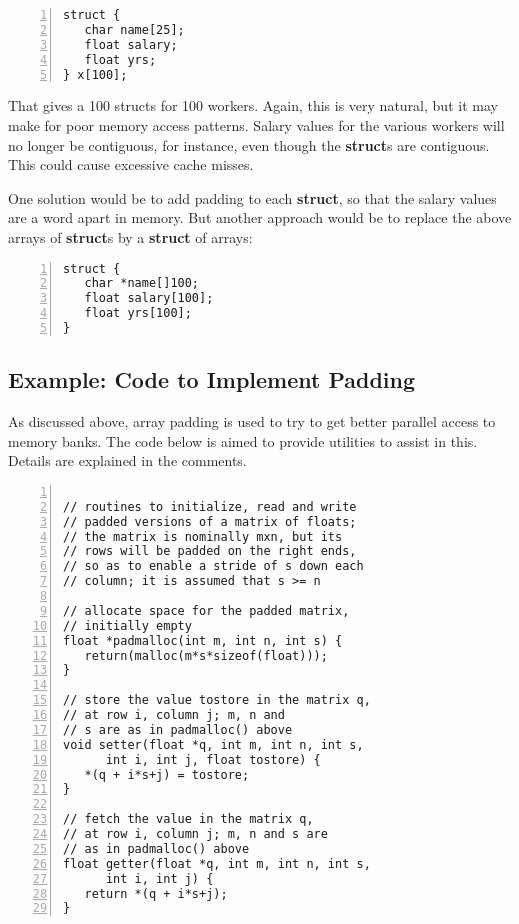 \begin{lstlisting}[numbers=left]
struct {
   char name[25];
   float salary;
   float yrs;
} x[100];
\end{lstlisting}

That gives a 100 structs for 100 workers.  Again, this is very natural,
but it may make for poor memory access patterns.  Salary values for the
various workers will no longer be contiguous, for instance, even though
the {\bf struct}s are contiguous.  This could cause excessive cache
misses.

One solution would be to add padding to each {\bf struct}, so that the
salary values are a word apart in memory.  But another approach would be
to replace the above arrays of {\bf struct}s by a {\bf struct} of
arrays:

\begin{lstlisting}[numbers=left]
struct {
   char *name[]100;
   float salary[100];
   float yrs[100];
}
\end{lstlisting}

\subsection{Example:  Code to Implement Padding}

As discussed above, array padding is used to try to get better parallel
access to memory banks.  The code below is aimed to provide utilities to
assist in this.  Details are explained in the comments.

\begin{lstlisting}[numbers=left]

// routines to initialize, read and write
// padded versions of a matrix of floats;
// the matrix is nominally mxn, but its
// rows will be padded on the right ends,
// so as to enable a stride of s down each
// column; it is assumed that s >= n

// allocate space for the padded matrix,
// initially empty
float *padmalloc(int m, int n, int s) {
   return(malloc(m*s*sizeof(float)));
}

// store the value tostore in the matrix q,
// at row i, column j; m, n and
// s are as in padmalloc() above
void setter(float *q, int m, int n, int s,
      int i, int j, float tostore) {
   *(q + i*s+j) = tostore;
}

// fetch the value in the matrix q,
// at row i, column j; m, n and s are
// as in padmalloc() above
float getter(float *q, int m, int n, int s,
      int i, int j) {
   return *(q + i*s+j);
}
\end{lstlisting}


